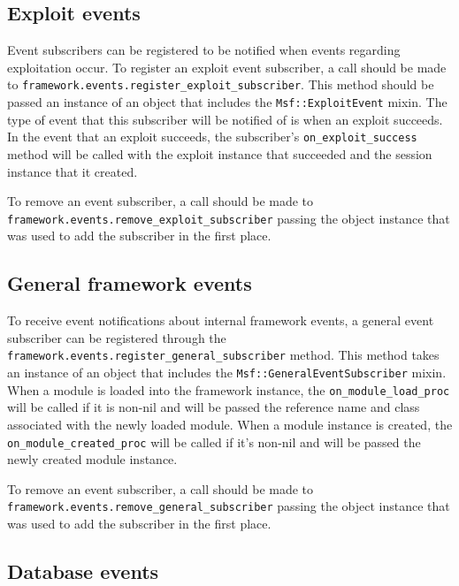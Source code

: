 \documentclass{report}
\begin{document}
        \subsection{Exploit events}

\par
Event subscribers can be registered to be notified when events
regarding exploitation occur.  To register an exploit event
subscriber, a call should be made to
\texttt{framework.events.register\_exploit\_subscriber}.  This
method should be passed an instance of an object that includes the
\texttt{Msf::ExploitEvent} mixin.  The type of event that this
subscriber will be notified of is when an exploit succeeds.  In the
event that an exploit succeeds, the subscriber's
\texttt{on\_exploit\_success} method will be called with the exploit
instance that succeeded and the session instance that it created.

\par
To remove an event subscriber, a call should be made to\\
\texttt{framework.events.remove\_exploit\_subscriber} passing the
object instance that was used to add the subscriber in the first
place.

        \subsection{General framework events}

\par
To receive event notifications about internal framework events, a
general event subscriber can be registered through the
\texttt{framework.events.register\_general\_subscriber} method.
This method takes an instance of an object that includes the
\texttt{Msf::GeneralEventSubscriber} mixin.  When a module is loaded
into the framework instance, the \texttt{on\_module\_load\_proc}
will be called if it is non-nil and will be passed the reference
name and class associated with the newly loaded module. When a
module instance is created, the \texttt{on\_module\_created\_proc}
will be called if it's non-nil and will be passed the newly created
module instance.

\par
To remove an event subscriber, a call should be made to\\
\texttt{framework.events.remove\_general\_subscriber} passing the
object instance that was used to add the subscriber in the first
place.

        \subsection{Database events}
\end{document}
